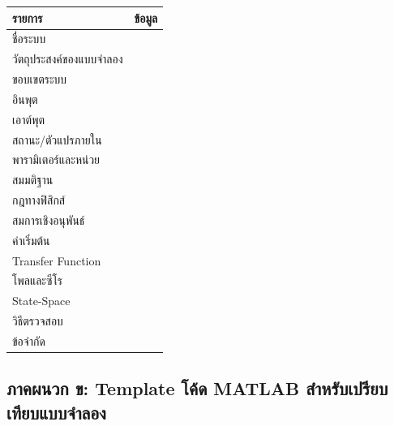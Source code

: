 \begin{table}[htbp]
    \centering
    \begin{tabular}{l l}
        \hline
        \textbf{รายการ} & \textbf{ข้อมูล} \\
        \hline
        ชื่อระบบ &  \\
        วัตถุประสงค์ของแบบจำลอง &  \\
        ขอบเขตระบบ &  \\
        อินพุต &  \\
        เอาต์พุต &  \\
        สถานะ/ตัวแปรภายใน &  \\
        พารามิเตอร์และหน่วย &  \\
        สมมติฐาน &  \\
        กฎทางฟิสิกส์ &  \\
        สมการเชิงอนุพันธ์ &  \\
        ค่าเริ่มต้น &  \\
        Transfer Function &  \\
        โพลและซีโร &  \\
        State-Space &  \\
        วิธีตรวจสอบ &  \\
        ข้อจำกัด &  \\
        \hline
    \end{tabular}
\end{table}

\subsection{ภาคผนวก ข: Template โค้ด MATLAB สำหรับเปรียบเทียบแบบจำลอง}

